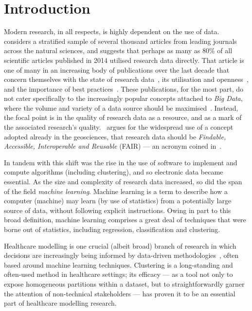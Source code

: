 \section{Introduction}\label{sec:intro}

Modern research, in all respects, is highly dependent on the use of
data.~\cite{Womack2015} considers a stratified sample of several thousand
articles from leading journals across the natural sciences, and suggests that
perhaps as many as 80\% of all scientific articles published in 2014 utilised
research data directly. That article is one of many in an increasing body of
publications over the last decade that concern themselves with the state of
research data~\cite{Higman2019}, its utilisation and
openness~\cite{Aslam2017,Zuiderwijk2020}, and the importance of best
practices~\cite{Colavizza2020,Corti2019}. These publications, for the most part,
do not cater specifically to the increasingly popular concepts attached to
\emph{Big Data}, where the volume and variety of a data source should be  %
maximised~\cite{Batisti2019}. Instead, the focal point is in the quality of
research data as a resource, and as a mark of the associated research's
quality.~\cite{Stall2019} argues for the widespread use of a concept adopted
already in the geosciences, that research data should be \emph{Findable,
Accessible, Interoperable and Reusable} (FAIR) --- an acronym coined
in~\cite{Wilkinson2016}.

In tandem with this shift was the rise in the use of software to implement and
compute algorithms (including clustering), and so electronic data became
essential. As the size and complexity of research data increased, so did the
span of the field \emph{machine learning}. Machine learning is a term to
describe how a computer (machine) may learn (by use of statistics) from a
potentially large source of data, without following explicit instructions. Owing
in part to this broad definition, machine learning comprises a great deal of
techniques that were borne out of statistics, including regression,
classification and clustering.

Healthcare modelling is one crucial (albeit broad) branch of research in which
decisions are increasingly being informed by data-driven
methodologies~\cite{Alexander2018,Belle2015,RiosZertuche2020}, often based
around machine learning techniques. Clustering is a long-standing and often-used
method in healthcare settings; its efficacy --- as a tool not only to expose
homogeneous partitions within a dataset, but to straightforwardly garner the
attention of non-technical stakeholders --- has proven it to be an essential
part of healthcare modelling research.

